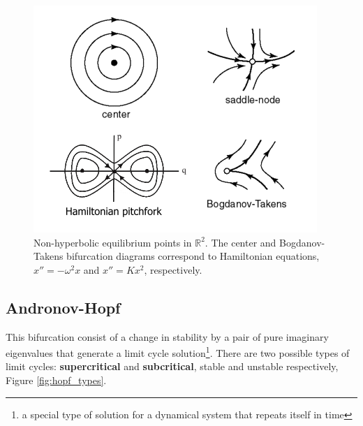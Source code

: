 \begin{minipage}{0.45\linewidth}
\begin{figure}[H]
    \centering
    \includegraphics[width=1.1\linewidth]{Images/4d.png}
    \caption{Non-hyperbolic equilibrium points in $\mathbb{R}^2$. The center and Bogdanov-Takens bifurcation diagrams correspond to Hamiltonian equations, $x''=-\omega^2 x$ and $x''=Kx^2$, respectively.}
    \label{fig:4d}
\end{figure}
\end{minipage}



\subsection{Andronov-Hopf}

This bifurcation consist of a change in stability by a pair of pure imaginary eigenvalues that generate a limit cycle solution\footnote{a special type of solution for a dynamical system that repeats itself in time}. There are two possible types of limit cycles: \textbf{supercritical} and \textbf{subcritical}, stable and unstable respectively, Figure \ref{fig:hopf_types}.


